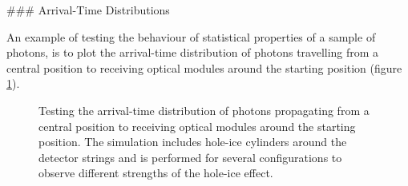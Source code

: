 ### Arrival-Time Distributions


An example of testing the behaviour of statistical properties of a sample of photons, is to plot the arrival-time distribution of photons travelling from a central position to receiving optical modules around the starting position (figure \ref{fig:eipau6Ag}).

\begin{figure}[htbp]
  \hfill
  \caption{Testing the arrival-time distribution of photons propagating from a central position to receiving optical modules around the starting position. The simulation includes hole-ice cylinders around the detector strings and is performed for several configurations to observe different strengths of the hole-ice effect.}
  \label{fig:eipau6Ag}
\end{figure}

